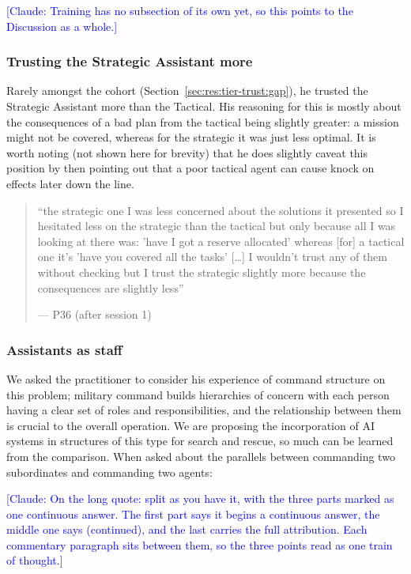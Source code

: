 \textcolor{blue}{[Claude: Training has no subsection of its own yet, so this points to the Discussion as a whole.]}

\subsubsection{Trusting the Strategic Assistant more}\label{sec:qual:practitioner:pt-strategic-trust}

Rarely amongst the cohort (Section~\ref{sec:res:tier-trust:gap}), he trusted the Strategic Assistant more than the Tactical. His reasoning for this is mostly about the consequences of a bad plan from the tactical being slightly greater: a mission might not be covered, whereas for the strategic it was just less optimal. It is worth noting (not shown here for brevity) that he does slightly caveat this position by then pointing out that a poor tactical agent can cause knock on effects later down the line.

\begin{quote}\small
``the strategic one I was less concerned about the solutions it presented so I hesitated less on the strategic than the tactical but only because all I was looking at there was: 'have I got a reserve allocated' whereas [for] a tactical one it's 'have you covered all the tasks' [\ldots{}] I wouldn't trust any of them without checking but I trust the strategic slightly more because the consequences are slightly less''\par\hfill--- P36 (after session 1)
\end{quote}

\subsubsection{Assistants as staff}\label{sec:qual:practitioner:pt-staff-process}

We asked the practitioner to consider his experience of command structure on this problem; military command builds hierarchies of concern with each person having a clear set of roles and responsibilities, and the relationship between them is crucial to the overall operation. We are proposing the incorporation of AI systems in structures of this type for search and rescue, so much can be learned from the comparison. When asked about the parallels between commanding two subordinates and commanding two agents:

\textcolor{blue}{[Claude: On the long quote: split as you have it, with the three parts marked as one continuous answer. The first part says it begins a continuous answer, the middle one says (continued), and the last carries the full attribution. Each commentary paragraph sits between them, so the three points read as one train of thought.]}

